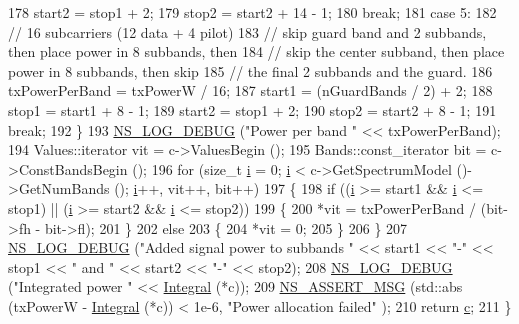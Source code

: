 \begin{DoxyCode}
178       start2 = stop1 + 2;
179       stop2 = start2 + 14 - 1;
180       \textcolor{keywordflow}{break};
181     \textcolor{keywordflow}{case} 5:
182       \textcolor{comment}{// 16 subcarriers (12 data + 4 pilot)}
183       \textcolor{comment}{// skip guard band and 2 subbands, then place power in 8 subbands, then}
184       \textcolor{comment}{// skip the center subband, then place power in 8 subbands, then skip}
185       \textcolor{comment}{// the final 2 subbands and the guard.}
186       txPowerPerBand = txPowerW / 16;
187       start1 = (nGuardBands / 2) + 2;
188       stop1 = start1 + 8 - 1;
189       start2 = stop1 + 2;
190       stop2 = start2 + 8 - 1;
191       \textcolor{keywordflow}{break};
192     \}
193   \hyperlink{group__logging_ga413f1886406d49f59a6a0a89b77b4d0a}{NS\_LOG\_DEBUG} (\textcolor{stringliteral}{"Power per band "} << txPowerPerBand);
194   Values::iterator vit = c->ValuesBegin ();
195   Bands::const\_iterator bit = c->ConstBandsBegin ();
196   \textcolor{keywordflow}{for} (\textcolor{keywordtype}{size\_t} \hyperlink{bernuolliDistribution_8m_a6f6ccfcf58b31cb6412107d9d5281426}{i} = 0; \hyperlink{bernuolliDistribution_8m_a6f6ccfcf58b31cb6412107d9d5281426}{i} < c->GetSpectrumModel ()->GetNumBands (); \hyperlink{bernuolliDistribution_8m_a6f6ccfcf58b31cb6412107d9d5281426}{i}++, vit++, bit++)
197     \{
198       \textcolor{keywordflow}{if} ((\hyperlink{bernuolliDistribution_8m_a6f6ccfcf58b31cb6412107d9d5281426}{i} >= start1 && \hyperlink{bernuolliDistribution_8m_a6f6ccfcf58b31cb6412107d9d5281426}{i} <= stop1) || (\hyperlink{bernuolliDistribution_8m_a6f6ccfcf58b31cb6412107d9d5281426}{i} >= start2 && \hyperlink{bernuolliDistribution_8m_a6f6ccfcf58b31cb6412107d9d5281426}{i} <= stop2))
199         \{
200           *vit = txPowerPerBand / (bit->fh - bit->fl);
201         \}
202       \textcolor{keywordflow}{else}
203         \{
204           *vit = 0;
205         \}
206     \}
207   \hyperlink{group__logging_ga413f1886406d49f59a6a0a89b77b4d0a}{NS\_LOG\_DEBUG} (\textcolor{stringliteral}{"Added signal power to subbands "} << start1 << \textcolor{stringliteral}{"-"} << stop1 << \textcolor{stringliteral}{" and "} << 
      start2 << \textcolor{stringliteral}{"-"} << stop2);
208   \hyperlink{group__logging_ga413f1886406d49f59a6a0a89b77b4d0a}{NS\_LOG\_DEBUG} (\textcolor{stringliteral}{"Integrated power "} << \hyperlink{namespacens3_a3dd3817567502f8bc77b04e47134c070}{Integral} (*c));
209   \hyperlink{assert_8h_aff5ece9066c74e681e74999856f08539}{NS\_ASSERT\_MSG} (std::abs (txPowerW - \hyperlink{namespacens3_a3dd3817567502f8bc77b04e47134c070}{Integral} (*c)) < 1e-6, \textcolor{stringliteral}{"Power allocation failed"}
      );
210   \textcolor{keywordflow}{return} \hyperlink{lte_2model_2fading-traces_2fading__trace__generator_8m_ae0323a9039add2978bf5b49550572c7c}{c};
211 \}
\end{DoxyCode}


